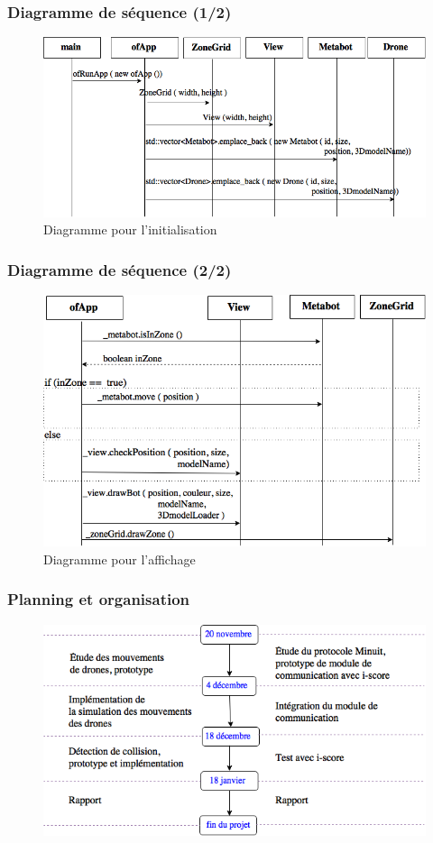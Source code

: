 \documentclass[10pt]{beamer}
\begin{document}
\begin{frame}
	\frametitle{Diagramme de séquence (1/2)}
	\begin{figure}
     \includegraphics[scale=0.42]{diagramme_sequence_initialisation.png}
	\caption{Diagramme pour l'initialisation}
    \end{figure}
\end{frame}

\begin{frame}
	\frametitle{Diagramme de séquence (2/2)}
	\begin{figure}
     \includegraphics[scale=0.45]{diagramme_sequence_draw.png}
	\caption{Diagramme pour l'affichage}
    \end{figure}
\end{frame}



\begin{frame}
	\frametitle{Planning et organisation}
	\begin{figure}
     \includegraphics[scale=0.5]{calendrier.png}
    \end{figure}
\end{frame}

\end{document}
